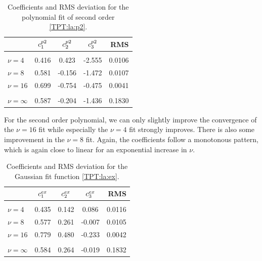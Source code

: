 \documentclass[8.5pt,twoside,twocolumn]{article}
\theoremstyle{standard}
\begin{document}
\begin{table}[h]
  \centering
  \caption{Coefficients and RMS deviation for the polynomial fit of second order \eqref{TPT:la:p2}.}
    \begin{tabular}{l | ccc | r}
         & $c^{p2}_1$ & $c^{p2}_2$ & $c^{p2}_3$  & RMS \\[2pt]
    \hline
    & & &\\[-.25cm]
    $\nu=4$ & 0.416 & 0.423 & -2.555 & 0.0106\\
    $\nu=8$ & 0.581  & -0.156 & -1.472 & 0.0107\\
    $\nu=16$ & 0.699 &  -0.754 & -0.475 & 0.0041\\[2pt] \hline
    & & & \\[-.32cm]
    $\nu=\infty$ &  0.587 &-0.204 & -1.436 & 0.1830\\[2pt]
    \hline
    \end{tabular}%
    \label{TPT:tableP2}
\end{table}%
For the second order polynomial, we can only slightly improve the convergence of the $\nu=16$
fit while especially the $\nu=4$ fit strongly improves. There is also some improvement in the
$\nu=8$ fit. Again, the coefficients follow a monotonous pattern, which is again
close to linear for an exponential increase in $\nu$. 

\begin{table}[h]
  \centering
  \caption{Coefficients and RMS deviation for the Gaussian fit function \eqref{TPT:la:ex}.}
    \begin{tabular}{l | ccc | r}
         & $c^{ex}_1$ & $c^{ex}_2$ & $c^{ex}_3$  & RMS \\[2pt]
    \hline
    & & &\\[-.25cm]
    $\nu=4$ & 0.435 & 0.142 & 0.086 & 0.0116 \\
    $\nu=8$ & 0.577 & 0.261 & -0.007 & 0.0105\\
    $\nu=16$ & 0.779 & 0.480 & -0.233 & 0.0042\\[2pt] \hline
    & & & \\[-.32cm]
    $\nu=\infty$ &  0.584 & 0.264 & -0.019 & 0.1832\\[2pt]
    \hline
    \end{tabular}%
    \label{TPT:tableGauss}
\end{table}%
\end{document}
